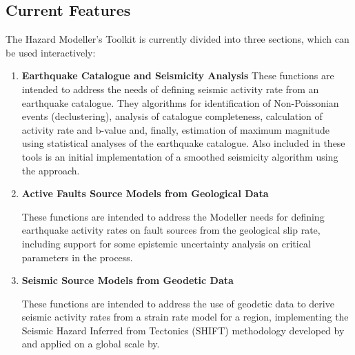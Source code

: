 
\subsection{Current Features}

The Hazard Modeller's Toolkit is currently divided into three sections, which can be used interactively: 

\begin{enumerate}
\item \textbf{Earthquake Catalogue and Seismicity Analysis}
    These functions are intended to address the needs of defining seismic activity rate from an earthquake catalogue. They algorithms for identification of Non-Poissonian events (declustering), analysis of catalogue completeness, calculation of activity rate and b-value and, finally, estimation of maximum magnitude using statistical analyses of the earthquake catalogue. Also included in these tools is an initial implementation of a smoothed seismicity algorithm using the \cite{frankel1995} approach.
     
\item \textbf{Active Faults Source Models from Geological Data}

    These functions are intended to address the Modeller needs for defining earthquake activity rates on fault sources from the geological slip rate, including support for some epistemic uncertainty analysis on critical parameters in the process.

\item \textbf{Seismic Source Models from Geodetic Data}

    These functions are intended to address the use of geodetic data to derive seismic activity rates from a strain rate model for a region, implementing the Seismic Hazard Inferred from Tectonics (SHIFT) methodology developed by \cite{BirdLiu2007} and applied on a global scale by\cite{Bird_etal2010}.
\end{enumerate}

